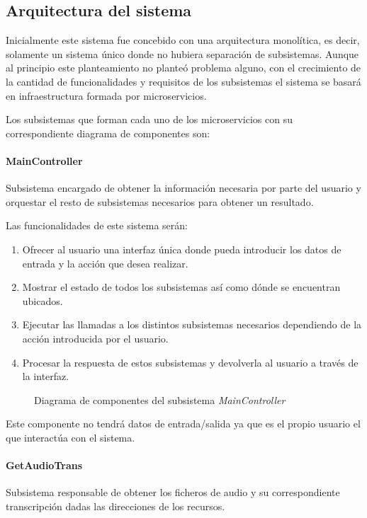 \documentclass[../main.tex]{subfiles}
\begin{document}
\subsection{Arquitectura del sistema}\label{subsec:arquitectura_sistema}
Inicialmente este sistema fue concebido con una arquitectura monolítica, es decir, solamente un sistema único donde no hubiera separación de subsistemas. Aunque al principio este planteamiento no planteó problema alguno, con el crecimiento de la cantidad de funcionalidades y requisitos de los subsistemas el sistema se basará en infraestructura formada por microservicios.


Los subsistemas que forman cada uno de los microservicios con su correspondiente diagrama de componentes son:
\paragraph{MainController}\label{par:maincontroller}
Subsistema encargado de obtener la información necesaria por parte del usuario y orquestar el resto de subsistemas necesarios para obtener un resultado.

Las funcionalidades de este sistema serán:
\begin{enumerate}
    \item Ofrecer al usuario una interfaz única donde pueda introducir los datos de entrada y la acción que desea realizar.
    \item Mostrar el estado de todos los subsistemas así como dónde se encuentran ubicados.
    \item Ejecutar las llamadas a los distintos subsistemas necesarios dependiendo de la acción introducida por el usuario.
    \item Procesar la respuesta de estos subsistemas y devolverla al usuario a través de la interfaz.
\end{enumerate}

\begin{figure}[H]
    \centering
    
    \label{fig:components_main}
    \caption{Diagrama de componentes del subsistema \textit{MainController}}
\end{figure}

Este componente no tendrá datos de entrada/salida ya que es el propio usuario el que interactúa con el sistema.

\paragraph{GetAudioTrans}\label{par:getaudiotrans}
Subsistema responsable de obtener los ficheros de audio y su correspondiente transcripción dadas las direcciones de los recursos.
\end{document}
